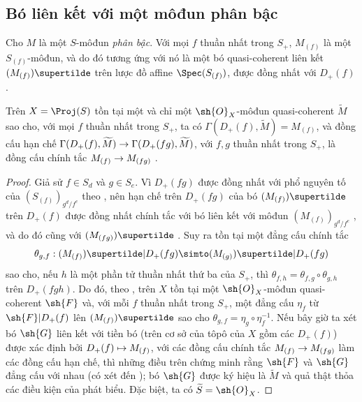 \documentclass[oneside,10pt]{amsart}
\makeatletter
\newcommand{\ega@arrow}[2]{\mathchoice{#1}{#2}{#2}{#2}}
\let\ega@shortmapsto\mapsto
\renewcommand{\to}{\ega@arrow{\longrightarrow}{\rightarrow}}
\renewcommand{\mapsto}{\ega@arrow{\longmapsto}{\ega@shortmapsto}}
\newcommand{\oldpage}[2][]{\marginnote{\normalfont\footnotesize\textbf{#1}~|~#2}\ignorespaces}
\let\EGAOriginalLabel\label
\renewcommand{\label}[1]{\phantomsection\EGAOriginalLabel{#1}}
\makeatother
\begin{document}
\subsection{Bó liên kết với một môđun phân bậc}
\label{subsection:II.2.5}

\begin{env}[2.5.1]
\label{II.2.5.1}
Cho $M$ là một $S$-môđun \emph{phân bậc}.
Với mọi $f$ thuần nhất trong $S_+$, $M_{(f)}$ là một $S_{(f)}$-môđun, và do đó tương ứng với nó là một bó quasi-coherent liên kết $(M_{(f)})\supertilde$ trên lược đồ affine $\Spec(S_{(f)})$, được đồng nhất với $D_+(f)$ .
\end{env}
\oldpage[II]{31}
\begin{proposition}[2.5.2]
\label{II.2.5.2}
Trên $X=\Proj(S)$ tồn tại một và chỉ một $\sh{O}_X$-môđun quasi-coherent $\widetilde{M}$ sao cho, với mọi $f$ thuần nhất trong $S_+$, ta có $\Gamma(D_+(f),\widetilde{M})=M_{(f)}$, và đồng cấu hạn chế $\Gamma(D_+(f),\widetilde{M})\to\Gamma(D_+(fg),\widetilde{M})$, với $f,g$ thuần nhất trong $S_+$, là đồng cấu chính tắc $M_{(f)}\to M_{(fg)}$ .
\end{proposition}

\begin{proof}
Giả sử $f\in S_d$ và $g\in S_e$.
Vì $D_+(fg)$ được đồng nhất với phổ nguyên tố của $(S_{(f)})_{g^d/f^e}$ theo , nên hạn chế trên $D_+(fg)$ của bó $(M_{(f)})\supertilde$ trên $D_+(f)$ được đồng nhất chính tắc với bó liên kết với môđun $(M_{(f)})_{g^d/f^e}$ , và do đó cũng với $(M_{(fg)})\supertilde$ .
Suy ra tồn tại một đẳng cấu chính tắc
\[
  \theta_{g,f}:(M_{(f)})\supertilde|D_+(fg)
  \simto(M_{(g)})\supertilde|D_+(fg)
\]
sao cho, nếu $h$ là một phần tử thuần nhất thứ ba của $S_+$, thì $\theta_{f,h}=\theta_{f,g}\circ\theta_{g,h}$ trên $D_+(fgh)$.
Do đó, theo , trên $X$ tồn tại một $\sh{O}_X$-môđun quasi-coherent $\sh{F}$ và, với mỗi $f$ thuần nhất trong $S_+$, một đẳng cấu $\eta_f$ từ $\sh{F}|D_+(f)$ lên $(M_{(f)})\supertilde$ sao cho $\theta_{g,f}=\eta_g\circ\eta_f^{-1}$.
Nếu bây giờ ta xét bó $\sh{G}$ liên kết với tiền bó (trên cơ sở của tôpô của $X$ gồm các $D_+(f)$) được xác định bởi $D_+(f)\mapsto M_{(f)}$, với các đồng cấu chính tắc $M_{(f)}\to M_{(fg)}$ làm các đồng cấu hạn chế, thì những điều trên chứng minh rằng $\sh{F}$ và $\sh{G}$ đẳng cấu với nhau (có xét đến ); bó $\sh{G}$ được ký hiệu là $\widetilde{M}$ và quả thật thỏa các điều kiện của phát biểu.
Đặc biệt, ta có $\widetilde{S}=\sh{O}_X$.
\end{proof}
\end{document}
